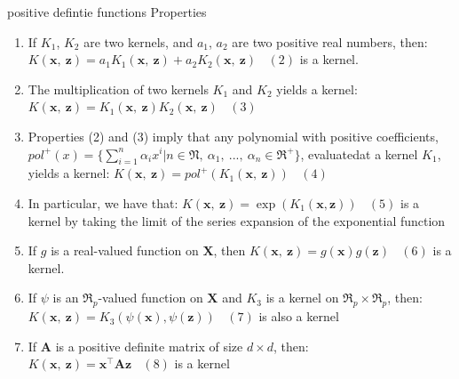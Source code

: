 \documentclass[
  ignorenonframetext,
]{beamer}
\begin{document}
\begin{frame}{positive defintie functions Properties}
\protect\hypertarget{positive-defintie-functions-properties}{}
\begin{enumerate}
\item
  If \(K_1\), \(K_2\) are two kernels, and \(a_1\), \(a_2\) are two
  positive real numbers, then:
  \(K(\pmb x,\ \pmb z) = a_1K_1(\pmb x,\ \pmb z) + a_2K_2(\pmb x,\ \pmb z)\ \ \ \ (2)\)
  is a kernel.
\item
  The multiplication of two kernels \(K_1\) and \(K_2\) yields a kernel:
  \(K(\pmb x,\ \pmb z) = K_1(\pmb x,\ \pmb z)K_2(\pmb x,\ \pmb z)\ \ \ \  (3)\)
\item
  Properties (2) and (3) imply that any polynomial with positive
  coefficients,
  \(pol^+(x) = \{ \sum^n_{i=1} \alpha_i x^i|n \in \mathfrak N,\ \alpha_1,\ ... ,\ \alpha_n \in \mathfrak R^+ \}\),
  evaluatedat a kernel \(K_1\), yields a kernel:
  \(K(\pmb x,\ \pmb z) = pol^+(K_1(\pmb x,\ \pmb z)) \ \ \ \ (4)\)
\end{enumerate}
\end{frame}

\begin{frame}{}
\protect\hypertarget{section}{}
\begin{enumerate}
\setcounter{enumi}{3}
\item
  In particular, we have that:
  \(K(\pmb x,\ \pmb z) = \exp(K_1(\pmb x, \pmb z)) \ \ \ \ (5)\) is a
  kernel by taking the limit of the series expansion of the exponential
  function
\item
  If \(g\) is a real-valued function on \(\pmb X\), then
  \(K(\pmb x,\ \pmb z) = g(\pmb x)g(\pmb z) \ \ \ \ (6)\) is a kernel.
\item
  If \(\psi\) is an \(\mathfrak R_p\)-valued function on \(\pmb X\) and
  \(K_3\) is a kernel on \(\mathfrak R_p \times \mathfrak R_p\), then:
  \(K(\pmb x,\ \pmb z) = K_3(\psi(\pmb x), \psi(\pmb z))\ \ \ \ (7)\) is
  also a kernel
\item
  If \(\pmb A\) is a positive definite matrix of size \(d \times d\),
  then: \(K(\pmb x,\ \pmb z) = \pmb x^{\top} \pmb A \pmb z \ \ \ \ (8)\)
  is a kernel
\end{enumerate}
\end{frame}
\end{document}
